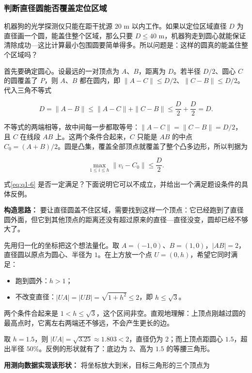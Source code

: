 \subsubsection{判断直径圆能否覆盖定位区域}\label{sec:q1-3}

机器狗的光学探测仪只能在距干扰源 $20$ m 以内工作。如果以定位区域直径 $D$ 为直径画一个圆，能盖住整个区域，那么只要 $D\le40$ m，机器狗走到圆心就能保证清除成功---这比计算最小包围圆要简单得多。所以问题是：这样的圆真的能盖住整个区域吗？

首先要确定圆心。设最远的一对顶点为 $A$、$B$，距离为 $D$。若半径 $D/2$、圆心 $C$ 的圆覆盖了 $P$，则 $A$、$B$ 都在圆内，即 $\|A-C\|\le D/2$、$\|C-B\|\le D/2$。代入三角不等式

\[
D=\|A-B\|\le\|A-C\|+\|C-B\|\le\frac D2+\frac D2=D .
\]

不等式的两端相等，故中间每一步都取等号：$\|A-C\|=\|C-B\|=D/2$，且 $C$ 在线段 $AB$ 上。这两个条件合起来，$C$ 只能是 $AB$ 的中点 $C_0=(A+B)/2$。圆是凸集，覆盖全部顶点就覆盖了整个凸多边形，所以判据为

\begin{equation}\label{eq:q1-6}
\max_{1\le i\le h}\|v_i-C_0\|\le\frac D2 .
\end{equation}

式\eqref{eq:q1-6} 是否一定满足？下面说明它可以不成立，并给出一个满足题设条件的具体反例。

\textbf{构造思路：} 要让直径圆盖不住区域，需要找到这样一个顶点：它已经跑到了直径圆外面，但它到其他顶点的距离还没有超过原来的直径---直径没变，圆却已经不够大了。

先用归一化的坐标把这个想法量化。取 $A=(-1,0)$、$B=(1,0)$，$|AB|=2$，直径圆以原点为圆心、半径为 $1$。在上方放一个点 $U=(0,h)$，希望它同时满足：

\begin{itemize}
\item 跑到圆外：$h>1$；
\item 不改变直径：$|UA|=|UB|=\sqrt{1+h^2}\le2$，即 $h\le\sqrt{3}$。
\end{itemize}

两个条件合起来是 $1<h\le\sqrt{3}$，这个区间非空。直观地理解：上顶点刚越过圆的最高点时，它离左右两端还不够远，不会产生更长的边。

取 $h=1.5$，则 $|UA|=\sqrt{3.25}\approx1.803<2$，直径仍为 $2$；而上顶点距圆心 $1.5$，超出半径 $50\%$。反例的形状就有了：底边为 $2$、高为 $1.5$ 的等腰三角形。

\textbf{用测向数据实现该形状：} 将坐标放大到米，目标三角形的三个顶点为

